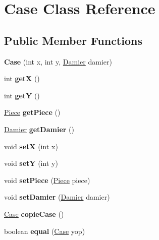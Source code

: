 \hypertarget{class_case}{}\section{Case Class Reference}
\label{class_case}
\subsection*{Public Member Functions}
\begin{DoxyCompactItemize}
\item 
{\bfseries Case} (int x, int y, \hyperlink{class_damier}{Damier} damier)\hypertarget{class_case_ae64d387de91dc66844e607afeeeec911}{}\label{class_case_ae64d387de91dc66844e607afeeeec911}

\item 
int {\bfseries getX} ()\hypertarget{class_case_a809c70632df92bf71504afe2c3401be4}{}\label{class_case_a809c70632df92bf71504afe2c3401be4}

\item 
int {\bfseries getY} ()\hypertarget{class_case_a382d788769c0ee8c984ed47b8a24585d}{}\label{class_case_a382d788769c0ee8c984ed47b8a24585d}

\item 
\hyperlink{class_piece}{Piece} {\bfseries get\+Piece} ()\hypertarget{class_case_a642391cf4cff2ec20ebc8909ecbb562d}{}\label{class_case_a642391cf4cff2ec20ebc8909ecbb562d}

\item 
\hyperlink{class_damier}{Damier} {\bfseries get\+Damier} ()\hypertarget{class_case_afe8c3c5323166c31d7c758dbc2efd080}{}\label{class_case_afe8c3c5323166c31d7c758dbc2efd080}

\item 
void {\bfseries setX} (int x)\hypertarget{class_case_ac46e99e107e16075b1cf4b14066e50af}{}\label{class_case_ac46e99e107e16075b1cf4b14066e50af}

\item 
void {\bfseries setY} (int y)\hypertarget{class_case_a704d56ebbeb2a8cd500a361090c152f3}{}\label{class_case_a704d56ebbeb2a8cd500a361090c152f3}

\item 
void {\bfseries set\+Piece} (\hyperlink{class_piece}{Piece} piece)\hypertarget{class_case_a1b222c7d71df614c4a0899c80babe196}{}\label{class_case_a1b222c7d71df614c4a0899c80babe196}

\item 
void {\bfseries set\+Damier} (\hyperlink{class_damier}{Damier} damier)\hypertarget{class_case_a6db0b310d4eaf0ae984b9f489c4ccf4b}{}\label{class_case_a6db0b310d4eaf0ae984b9f489c4ccf4b}

\item 
\hyperlink{class_case}{Case} {\bfseries copie\+Case} ()\hypertarget{class_case_af0f47703c89d8337c4b5839bf2dc12cd}{}\label{class_case_af0f47703c89d8337c4b5839bf2dc12cd}

\item 
boolean {\bfseries equal} (\hyperlink{class_case}{Case} yop)\hypertarget{class_case_a371c658843374088f839c2ed567f0fc8}{}\label{class_case_a371c658843374088f839c2ed567f0fc8}

\end{DoxyCompactItemize}


